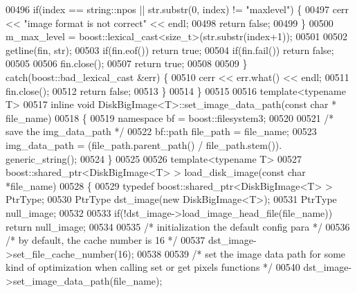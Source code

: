 \begin{DoxyCode}
00496         \textcolor{keywordflow}{if}(index == string::npos || str.substr(0, index) != \textcolor{stringliteral}{"maxlevel"}) \{
00497             cerr << \textcolor{stringliteral}{"image format is not correct"} << endl;
00498             \textcolor{keywordflow}{return} \textcolor{keyword}{false};
00499         \}
00500         m\_max\_level = boost::lexical\_cast<\textcolor{keywordtype}{size\_t}>(str.substr(index+1));
00501 
00502                 getline(fin, str);
00503         \textcolor{keywordflow}{if}(fin.eof()) \textcolor{keywordflow}{return} \textcolor{keyword}{true};
00504         \textcolor{keywordflow}{if}(fin.fail()) \textcolor{keywordflow}{return} \textcolor{keyword}{false};
00505 
00506         fin.close();
00507                 \textcolor{keywordflow}{return} \textcolor{keyword}{true};
00508 
00509         \} \textcolor{keywordflow}{catch}(boost::bad\_lexical\_cast &err) \{
00510                 cerr << err.what() << endl;
00511                 fin.close();
00512                 \textcolor{keywordflow}{return} \textcolor{keyword}{false};
00513         \}
00514 \}
00515 
00516 \textcolor{keyword}{template}<\textcolor{keyword}{typename} T>
00517 \textcolor{keyword}{inline} \textcolor{keywordtype}{void} DiskBigImage<T>::set_image_data_path(\textcolor{keyword}{const} \textcolor{keywordtype}{char} * file\_name) 
00518 \{
00519         \textcolor{keyword}{namespace }bf = boost::filesystem3;
00520 
00521         \textcolor{comment}{/* save the img\_data\_path */}
00522         bf::path file\_path = file\_name;
00523         img\_data\_path = (file\_path.parent\_path() / file\_path.stem()).
      generic\_string();
00524 \}
00525 
00526 \textcolor{keyword}{template}<\textcolor{keyword}{typename} T>
00527 boost::shared\_ptr<DiskBigImage<T> > load\_disk\_image(\textcolor{keyword}{const} \textcolor{keywordtype}{char} *file\_name)
00528 \{
00529         \textcolor{keyword}{typedef} boost::shared\_ptr<DiskBigImage<T> > PtrType;
00530         PtrType dst\_image(\textcolor{keyword}{new} DiskBigImage<T>);
00531         PtrType null\_image;
00532 
00533         \textcolor{keywordflow}{if}(!dst\_image->load\_image\_head\_file(file\_name))  \textcolor{keywordflow}{return} null\_image;
00534 
00535         \textcolor{comment}{/* initialization the default config para */}
00536         \textcolor{comment}{/* by default, the cache number is 16 */}
00537         dst\_image->set\_file\_cache\_number(16);
00538 
00539         \textcolor{comment}{/* set the image data path for some kind of optimization when calling
       set or get pixels functions */}
00540         dst\_image->set\_image\_data\_path(file\_name);

\end{DoxyCode}
